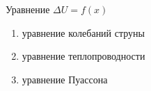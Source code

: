 Уравнение \(\Delta U=f(x)\)

\begin{enumerate}[label=\arabic*)]
    \item уравнение колебаний струны
    \item уравнение теплопроводности
    \item уравнение Пуассона
\end{enumerate}

